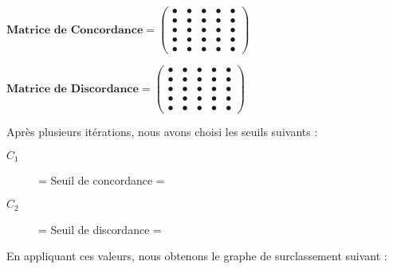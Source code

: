 \documentclass[12pt]{article}
\begin{document}
\begin{center}
$
\textbf{Matrice de Concordance} = 
\left( 
\begin{array}{ccccc}
• & • & • & • & • \\ 
• & • & • & • & • \\ 
• & • & • & • & • \\ 
• & • & • & • & • \\ 
• & • & • & • & •
\end{array}
\right) 
$

$
\textbf{Matrice de Discordance} = 
\left( 
\begin{array}{ccccc}
• & • & • & • & • \\ 
• & • & • & • & • \\ 
• & • & • & • & • \\ 
• & • & • & • & • \\ 
• & • & • & • & •
\end{array}
\right) 
$
\end{center}
Après plusieurs itérations, nous avons choisi les seuils suivants :
\begin{description}
\item[$C_{1}$] = Seuil de concordance = 
\item[$C_{2}$] = Seuil de discordance = 
\end{description}
En appliquant ces valeurs, nous obtenons le graphe de surclassement suivant :



\end{document}
